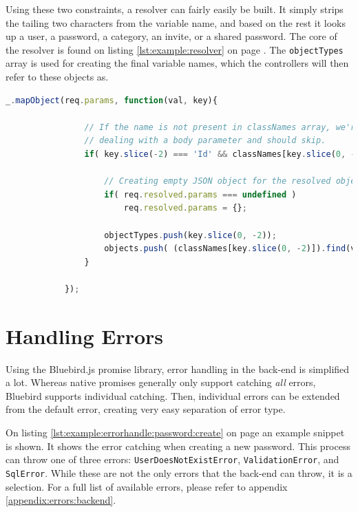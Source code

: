 		Using these two constraints, a resolver can fairly easily be built. It simply strips the tailing two characters from the variable name, and based on the rest it looks up a user, a password, a category, an invite, or a shared password. The core of the resolver is found on listing \ref{lst:example:resolver} on page \pageref{lst:example:resolver}. The \verb=objectTypes= array is used for creating the final variable names, which the controllers will then refer to these objects as.

		\begin{lstlisting}[gobble=12,language=JavaScript,caption={Object resolver middleware},label={lst:example:resolver}]
            _.mapObject(req.params, function(val, key){
            
                // If the name is not present in classNames array, we're
                // dealing with a body parameter and should skip.
                if( key.slice(-2) === 'Id' && classNames[key.slice(0, -2)] !== undefined ){
                    
                    // Creating empty JSON object for the resolved objects to be placed in
                    if( req.resolved.params === undefined ) 
                        req.resolved.params = {};
                    
                    objectTypes.push(key.slice(0, -2));
                    objects.push( (classNames[key.slice(0, -2)]).find(val) );
                }
            
            });
		\end{lstlisting}

	\section{Handling Errors}
		Using the Bluebird.js promise library, error handling in the back-end is simplified a lot. Whereas native promises generally only support catching \emph{all} errors, Bluebird supports individual catching. Then, individual errors can be extended from the default error, creating very easy separation of error type. 

		On listing \ref{lst:example:errorhandle:password:create} on page \pageref{lst:example:errorhandle:password:create} an example snippet is shown. It shows the error catching when creating a new password. This process can throw one of three errors: \verb=UserDoesNotExistError=, \verb=ValidationError=, and \verb=SqlError=. While these are not the only errors that the back-end can throw, it is a selection. For a full list of available errors, please refer to appendix \ref{appendix:errors:backend}.

